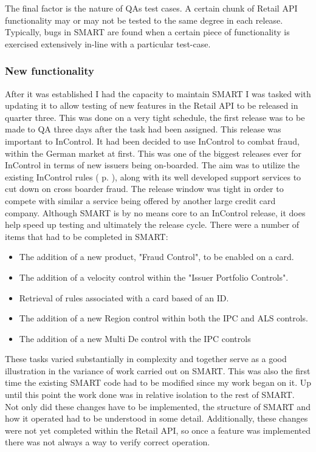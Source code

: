 \documentclass[a4paper, 11pt, titlepage]{article}
\begin{document}
The final factor is the nature of QAs test cases. A certain chunk of Retail API functionality may or may not be tested to the same degree in each release. Typically, bugs in SMART are found when a certain piece of functionality is exercised extensively in-line with a particular test-case. 
 
\subsubsection{New functionality} 
After it was established I had the capacity to maintain SMART I was tasked with updating it to allow testing of new features in the Retail API to be released in quarter three. This was done on a very tight schedule, the first release was to be made to QA three days after the task had been assigned. This release was important to InControl. It had been decided to use InControl to combat fraud, within the German market at first. This was one of the biggest releases ever for InControl in terms of new issuers being on-boarded. The aim was to utilize the existing InControl rules ( p. \pageref{rule_types} ), along with its well developed support services to cut down on cross boarder fraud. The release window was tight in order to compete with similar a service being offered by another large credit card company. Although SMART is by no means core to an InControl release, it does help speed up testing and ultimately the release cycle. There were a number of items that had to be completed in SMART: 
\begin{itemize} 
\item The addition of a new product, "Fraud Control", to be enabled on a card. 
\item The addition of a velocity control within the "Issuer Portfolio Controls". 
\item Retrieval of rules associated with a card based of an ID. 
\item The addition of a new Region control within both the IPC and ALS controls. 
\item The addition of a new Multi De control with the IPC controls 
\end{itemize} 
\label{fraud_control}
These tasks varied substantially in complexity and together serve as a good illustration in the variance of work carried out on SMART. This was also the first time the existing SMART code had to be modified since my work began on it. Up until this point the work done was in relative isolation to the rest of SMART. Not only did these changes have to be implemented, the structure of SMART and how it operated had to be understood in some detail. Additionally, these changes were not yet completed within the Retail API, so once a feature was implemented there was not always a way to verify correct operation. 
 
\end{document}
